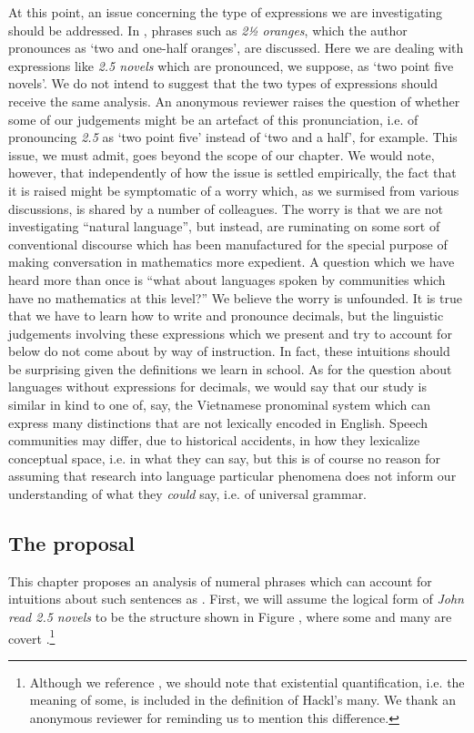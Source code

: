 \documentclass[output=paper]{langscibook}
\begin{document}
At this point, an issue concerning the type of expressions we are investigating should be addressed. In \citet{salmon1997}, phrases such as \textit{2½ oranges}, which the author pronounces as `two and one-half oranges', are discussed. Here we are dealing with expressions like \textit{2.5 novels} which are pronounced, we suppose, as `two point five novels'. We do not intend to suggest that the two types of expressions should receive the same analysis. An anonymous reviewer raises the question of whether some of our judgements might be an artefact of this pronunciation, i.e. of pronouncing \textit{2.5} as `two point five' instead of `two and a half', for example. This issue, we must admit, goes beyond the scope of our chapter. We would note, however, that independently of how the issue is settled empirically, the fact that it is raised might be symptomatic of a worry which, as we surmised from various discussions, is shared by a number of colleagues. The worry is that we are not investigating ``natural language'', but instead, are ruminating on some sort of conventional discourse which has been manufactured for the special purpose of making conversation in mathematics more expedient. A question which we have heard more than once is ``what about languages spoken by communities which have no mathematics at this level?'' We believe the worry is unfounded. It is true that we have to learn how to write and pronounce decimals, but the linguistic judgements involving these expressions which we present and try to account for below do not come about by way of instruction. In fact, these intuitions should be surprising given the definitions we learn in school. As for the question about languages without expressions for decimals, we would say that our study is similar in kind to one of, say, the Vietnamese pronominal system which can express many distinctions that are not lexically encoded in English. Speech communities may differ, due to historical accidents, in how they lexicalize conceptual space, i.e. in what they can say, but this is of course no reason for assuming that research into language particular phenomena does not inform our understanding of what they \textit{could} say, i.e. of universal grammar.


\subsection{The proposal}\largerpage

This chapter proposes an analysis of numeral phrases which can account for intuitions about such sentences as . First, we will assume the logical form of \textit{John read 2.5 novels} to be the structure shown in Figure , where {\sc some} and {\sc many} are covert \citep[cf.][]{Hackl:2000}.\footnote{Although we reference \citet{Hackl:2000}, we should note that existential quantification, i.e. the meaning of {\sc some}, is included in the definition of Hackl's {\sc many}. We thank an anonymous reviewer for reminding us to mention this difference.}
\end{document}
